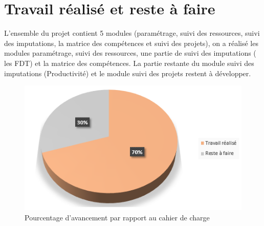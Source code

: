 \section{Travail réalisé et reste à faire}
L'ensemble du projet contient 5 modules (paramétrage, suivi des ressources, suivi des imputations, la matrice des compétences et suivi des projets), on a réalisé les modules paramétrage, suivi des ressources, une partie de suivi des imputations ( les FDT) et la matrice des compétences. La partie restante du module suivi des imputations (Productivité) et le module suivi des projets restent à développer.
\newpage
\begin{figure}[h!]  
	\centering
	\includegraphics[width=1\textwidth]{chapitre5/Figures/avancement.png}
	\caption{Pourcentage d'avancement par rapport au cahier de charge}
\end{figure}